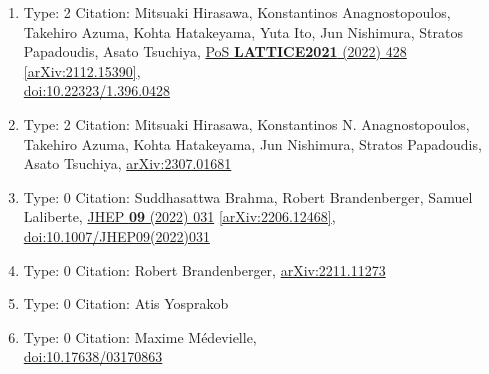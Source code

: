 \documentclass[a4paper,10pt]{article}
\begin{document}
\begin{enumerate}
\begin{enumerate}
  \item Type: 2 Citation: Mitsuaki Hirasawa, Konstantinos Anagnostopoulos, Takehiro Azuma, Kohta Hatakeyama, Yuta Ito, Jun Nishimura, Stratos Papadoudis, Asato Tsuchiya, \href{https://www.doi.org/10.22323/1.396.0428}{PoS {\bf LATTICE2021} (2022) 428}  \href{https://arxiv.org/abs/2112.15390}{[arXiv:2112.15390]},\\\href{https://www.doi.org/10.22323/1.396.0428}{doi:10.22323/1.396.0428}
  \item Type: 2 Citation: Mitsuaki Hirasawa, Konstantinos N. Anagnostopoulos, Takehiro Azuma, Kohta Hatakeyama, Jun Nishimura, Stratos Papadoudis, Asato Tsuchiya, \href{https://arxiv.org/abs/2307.01681}{arXiv:2307.01681}
  \item Type: 0 Citation: Suddhasattwa Brahma, Robert Brandenberger, Samuel Laliberte, \href{https://www.doi.org/10.1007/JHEP09(2022)031}{JHEP {\bf 09} (2022) 031}  \href{https://arxiv.org/abs/2206.12468}{[arXiv:2206.12468]},\\\href{https://www.doi.org/10.1007/JHEP09(2022)031}{doi:10.1007/JHEP09(2022)031}
  \item Type: 0 Citation: Robert Brandenberger, \href{https://arxiv.org/abs/2211.11273}{arXiv:2211.11273}
  \item Type: 0 Citation: Atis Yosprakob
  \item Type: 0 Citation: Maxime Médevielle,\\\href{https://www.doi.org/10.17638/03170863}{doi:10.17638/03170863}

\end{enumerate}
\end{enumerate}
\end{document}
